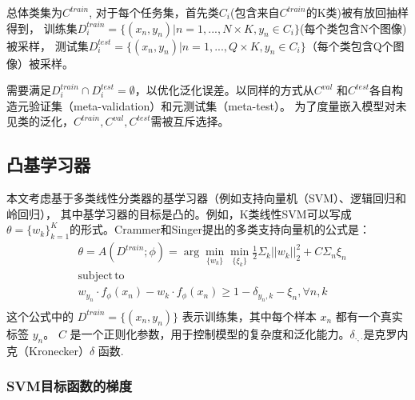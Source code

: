总体类集为$C^{train}$, 对于每个任务集，首先类$C_i$(包含来自$C^{train}$的K类)被有放回抽样得到，
训练集$D_i^{train} = \{(x_n, y_n) | n=1,...,N \times K, y_n \in C_i\}$(每个类包含N个图像)被采样，
测试集$D_i^{test} = \{(x_n, y_n) | n = 1,...,Q \times K, y_n \in C_i\}$（每个类包含Q个图像）被采样。

需要满足$D_i^{train} \cap D_i^{test} = \emptyset $，以优化泛化误差。以同样的方式从$C^{val}$
和$C^{test}$各自构造元验证集（meta-validation）和元测试集（meta-test）。
为了度量嵌入模型对未见类的泛化，$C^{train}, C^{val}, C^{test}$需被互斥选择。

\subsection{凸基学习器}


本文考虑基于多类线性分类器的基学习器（例如支持向量机（SVM）、逻辑回归和岭回归），
其中基学习器的目标是凸的。例如，K类线性SVM可以写成$\theta = \{w_k\}^K_{k=1}$的形式。Crammer和Singer提出的多类支持向量机的公式是：
\begin{equation}
    \label{equation:4}
\begin{aligned}
   & \theta = A(D^{train}; \phi) = \arg \min_{\{w_k\}}\min_{\{\xi_k\}}\frac{1}{2}\Sigma_k||w_k||_2^2 + C \Sigma_n \xi_n\\
   & \mathrm{subject \, to} \\
   & w_{y_n} \cdot f_{\phi}(x_n)-w_k \cdot f_\phi (x_n) \ge 1 - \delta_{y_n,k} - \xi_n, \forall n, k\\
\end{aligned}
\end{equation}
这个公式中的 $D^{train} = \{(x_n, y_n)\}$ 表示训练集，其中每个样本 $x_n$ 都有一个真实标签 $y_n$。
$C$ 是一个正则化参数，用于控制模型的复杂度和泛化能力。$δ_{·,·}$是克罗内克（Kronecker）$δ$ 函数.

\subsubsection{SVM目标函数的梯度}

